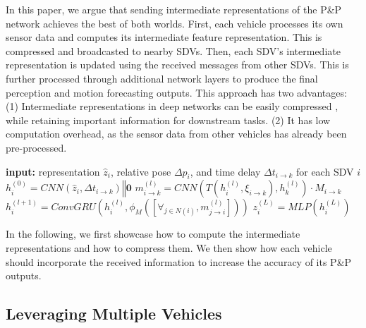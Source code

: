 \documentclass[runningheads]{llncs}
\newcommand{\pnp}{P\&P}
\begin{document}
In this paper, we argue that sending intermediate representations of the
\pnp{}
network achieves the best of both worlds.
First, each vehicle processes its own sensor data and computes its intermediate feature representation. 
This is compressed and broadcasted to nearby SDVs.
Then, 
each SDV's
intermediate representation is updated 
using
the received messages from other SDVs.
This 
is further processed through additional network layers to produce the final perception and motion forecasting
outputs.
This approach has two 
advantages:
(1) Intermediate representations in deep networks can be easily compressed \cite{choi2018high,Wei_2019_CVPR}, while retaining important information for downstream tasks.
(2) It has low computation overhead, as the 
sensor data from other vehicles has already been pre-processed.

\begin{algorithm}[t]
\caption{Cross-vehicle Aggregation}
\label{alg:cva}
\begin{algorithmic}[1]
\State \textbf{input:} 
representation $\hat{z}_i$,  relative pose $\Delta p_i$, and time delay $\Delta t_{i \rightarrow k}$ for each SDV $i$ %
\State $h_{i}^{(0)} = CNN(\hat{z}_i, \Delta t_{i \rightarrow k}) \mathbin\Vert \mathbf{0}$  \label{cva:init}
\EndFor
{} 
 
    \State $m_{i \rightarrow k}^{(l)} = CNN(T(h_{i}^{(l)}, \xi_{i \rightarrow k}), h_{k}^{(l)})  \cdot M_{i \rightarrow k}$  \label{cva:spatial}
    \State $h_{i}^{(l+1)} = ConvGRU(h_{i}^{(l)}, \phi_{M}([\forall_{j \in N(i)}, m_{j \rightarrow i}^{(l)}]))$  \label{cva:update}
\EndFor
\EndFor
\State ${z}^{(L)}_i = MLP(h^{(L)}_{i})$  \label{cva:final}
\end{algorithmic}
\end{algorithm}

In the following, we first showcase how to compute the intermediate representations and how to compress them.
We then show how  each vehicle should incorporate the received information to increase the accuracy of its
\pnp{}
outputs.

\subsection{Leveraging Multiple Vehicles}
\label{sec:v2vnet}
\end{document}
